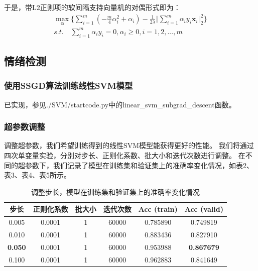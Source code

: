 \documentclass[12pt, a4paper]{article}
\newcommand{\ivec}{\bm}
\newcommand{\alphav}{\ivec{\alpha}}
\newcommand{\xv}{\ivec{x}}
\begin{document}
        于是，带L2正则项的软间隔支持向量机的对偶形式即为：
        \begin{align*}
        \max\limits_{\alphav}\{\sum_{i = 1}^{m} (- \frac{m}{4}\alpha_i^2 + \alpha_i) - \frac{1}{2 \lambda} \Vert \sum_{i = 1}^{m} \alpha_i y_i \xv_i \Vert_2^2\} \\
        s.t. \quad \sum_{i = 1}^{m} \alpha_i y_i = 0, \alpha_i \ge 0, i = 1, 2, ..., m
        \end{align*}

    \subsection{情绪检测}

    \subsubsection{使用SSGD算法训练线性SVM模型}

        已实现，参见./SVM/startcode.py中的linear\_svm\_subgrad\_descent函数。

    \subsubsection{超参数调整}

        调整超参数，我们希望训练得到的线性SVM模型能获得更好的性能。
        我们将通过四次单变量实验，分别对步长、正则化系数、批大小和迭代次数进行调整。
        在不同的超参数下，我们记录了模型在训练集和验证集上的准确率变化情况，如表2、表3、表4、表5所示。

        \begin{table}[htbp]
        \caption{调整步长，模型在训练集和验证集上的准确率变化情况}
        \centering
        \begin{tabular}{cccccc}
            \toprule
            步长           & 正则化系数 & 批大小 & 迭代次数 & Acc (train) & Acc (valid)        \\
            \midrule
            0.005          &  0.0001   &   1    &  60000  &  0.785890   &  0.749819          \\
            0.010          &  0.0001   &   1    &  60000  &  0.883436   &  0.827910          \\
            \textbf{0.050} &  0.0001   &   1    &  60000  &  0.953988   &  \textbf{0.867679} \\
            0.100          &  0.0001   &   1    &  60000  &  0.962883   &  0.841649
        \end{tabular}
        \end{table}
\end{document}
